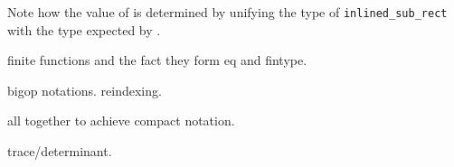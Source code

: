 Note how the value of  is determined by unifying the type
of \lstinline/inlined_sub_rect/ with the type expected by .




\mcbLEARN{}
\mcbPROVIDE{}
\mcbREQUIRE{}

finite functions and the fact they form eq and fintype.

bigop notations. reindexing.

\mcbLEARN{}
\mcbPROVIDE{}
\mcbREQUIRE{}

all together to achieve compact notation.

trace/determinant.


